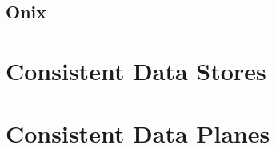 \subsection{Onix}
\label{sec:related:onix}

\glsresetall
\section{Consistent Data Stores}


\glsresetall
\section{Consistent Data Planes}


